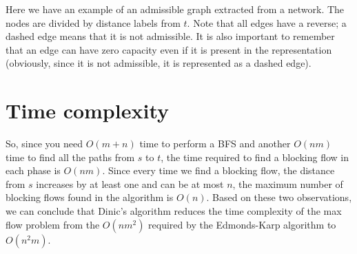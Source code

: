 \begin{center}

\end{center}
Here we have an example of an admissible graph extracted from a network.
The nodes are divided by distance labels from $t$.
Note that all edges have a reverse; a dashed edge means that it is not admissible. It is also important to remember that an edge can have zero capacity even if it is present in the representation (obviously, since it is not admissible, it is represented as a dashed edge).

\section{Time complexity}

So, since you need $O(m + n)$ time to perform a BFS and another $O(nm)$ time to find all the paths from $s$ to $t$, the time required to find a blocking flow in each phase is $O(nm)$.
Since every time we find a blocking flow, the distance from $s$ increases by at least one and can be at most $n$, the maximum number of blocking flows found in the algorithm is $O(n)$.
Based on these two observations, we can conclude that Dinic's algorithm reduces the time complexity of the max flow problem from the $O(nm^2)$ required by the Edmonds-Karp algorithm to $O(n^2m)$.

\cleardoublepage


